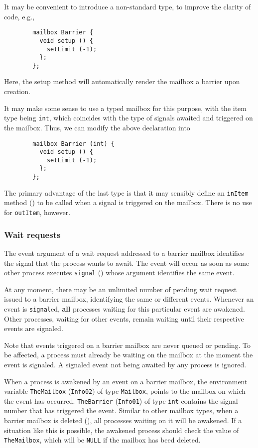 It may be convenient to introduce a non-standard type, to improve the
clarity of code, e.g.,
\begin{verbatim}
        mailbox Barrier {
          void setup () {
            setLimit (-1);
          };
        };
\end{verbatim}
Here, the setup method will automatically render the mailbox a barrier upon
creation.

It may make some sense to use a typed mailbox for this purpose, with the
item type being {\tt int}, which coincides with the type of signals awaited
and triggered on the mailbox.
Thus, we can modify the above declaration into
\begin{verbatim}
        mailbox Barrier (int) {
          void setup () {
            setLimit (-1);
          };
        };
\end{verbatim}
The primary advantage of the last type is that it may sensibly define
an {\tt inItem} method () to be called when a signal
is triggered on the mailbox.
There is no use for {\tt outItem}, however.

\subsubsection{Wait requests}
\label{rm_mb_ba_wr}

The event argument of a wait request addressed to a barrier mailbox identifies
the signal that the process wants to await.
The event will occur as soon as some other process executes {\tt signal}
() whose argument identifies the same event.

At any moment, there may be an unlimited number of pending wait request
issued to a barrier mailbox, identifying the same or different events.
Whenever an event is {\tt signal}ed, {\bf all} processes waiting for this
particular event are awakened.
Other processes, waiting for other events, remain waiting until their
respective events are signaled.

Note that events triggered on a barrier mailbox are never queued or pending.
To be affected, a process must already be waiting on the mailbox at the moment
the event is signaled.
A signaled event not being awaited by any process is ignored.

When a process is awakened by an event on a barrier mailbox, the environment
variable {\tt TheMailbox} ({\tt Info02})
of type {\tt Mailbox}, points to the mailbox on which the event has occurred.
{\tt TheBarrier} ({\tt Info01}) of type {\tt int} contains the signal number
that has triggered the event.
Similar to other mailbox types, when a barrier mailbox is deleted
(), all processes waiting on it will be awakened.
If a situation like this is possible, the awakened
process should check the value of {\tt TheMailbox}, which will be {\tt NULL}
if the mailbox has beed deleted.

